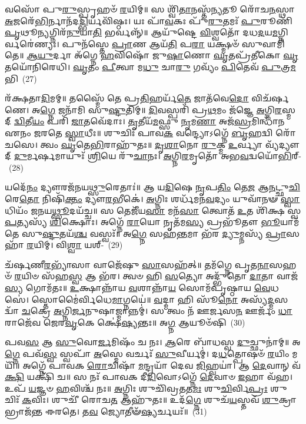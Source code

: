 𑌵𑌸𑍋᳴ 𑌪𑍁\-\ul{𑌰𑍁}\-𑌸𑍍𑌪𑍃𑌹𑍞᳴ \ul{𑌰}\-𑌯𑌿𑌮𑍍॥ 𑌸 𑌶𑍍𑌵𑌿᳴\-\ul{𑌤𑌾}\-𑌨𑌸𑍍𑌤᳴\-\ul{𑌨𑍍𑌯}\-𑌤𑍂 𑌰𑍋᳴𑌚\-\ul{𑌨}\-𑌸𑍍𑌥𑌾 \ul{𑌅}\-𑌜𑌰𑍇᳴\-\ul{𑌭𑌿}\-𑌰𑍍𑌨𑌾𑌨᳴𑌦\-\ul{𑌦𑍍𑌭𑌿}\-𑌰𑍍𑌯𑌵𑌿᳴𑌷𑍍𑌠𑌃। 𑌯𑌃 𑌪𑌾᳴\-\ul{𑌵}\-𑌕𑌃 𑌪𑍁᳴\-\ul{𑌰𑍁}\-𑌤𑌮𑌃᳴ \ul{𑌪𑍁}\-𑌰𑍂𑌣𑌿᳴ \ul{𑌪𑍃}\-𑌥𑍂\-\ul{𑌨𑍍𑌯}\-𑌗𑍍𑌨𑌿𑌰᳴\-\ul{𑌨𑍁}\-𑌯𑌾\-\ul{𑌤𑌿} 𑌭𑌰𑍍𑌵𑌨𑍍𑌨𑍍᳴॥ 𑌆𑌯𑍁᳴𑌷𑍍𑌟𑍇 \ul{𑌵𑌿}\-𑌶𑍍𑌵𑌤𑍋᳴ 𑌦𑌧\-\ul{𑌦}\-𑌯\-\ul{𑌮}\-𑌗𑍍𑌨𑌿𑌰𑍍𑌵𑌰𑍇॑𑌣𑍍𑌯𑌃। 𑌪𑍁𑌨᳴𑌸𑍍𑌤𑍇 \ul{𑌪𑍍𑌰𑌾}\-𑌣 𑌆𑌯᳴\-\ul{𑌤𑌿} 𑌪\-\ul{𑌰𑌾} 𑌯𑌕𑍍𑌷𑍍𑌮𑍞᳴ 𑌸𑍁𑌵𑌾𑌮𑌿 𑌤𑍇॥ \ul{𑌆}\-\-\ul{𑌯𑍁}\-𑌰𑍍𑌦𑌾 𑌅᳴𑌗𑍍𑌨𑍇 \ul{𑌹}\-𑌵𑌿𑌷𑍋᳴ 𑌜𑍁\-\ul{𑌷𑌾}\-𑌣𑍋 \ul{𑌘𑍃}\-𑌤𑌪𑍍𑌰᳴𑌤𑍀𑌕𑍋 \ul{𑌘𑍃}\-𑌤𑌯𑍋᳴𑌨𑌿𑌰𑍇𑌧𑌿। \ul{𑌘𑍃}\-𑌤𑌂 \ul{𑌪𑍀}\-𑌤𑍍𑌵𑌾 𑌮\-\ul{𑌧𑍁} 𑌚𑌾\-\ul{𑌰𑍁} 𑌗𑌵𑍍𑌯𑌂᳴ \ul{𑌪𑌿}\-𑌤𑍇𑌵᳴ \ul{𑌪𑍁}\-𑌤𑍍𑌰\-\ul{𑌮}\-𑌭𑌿~(27)

𑌰᳴𑌕𑍍𑌷𑌤𑌾\-\ul{𑌦𑌿}\-𑌮𑌮𑍍॥ 𑌤𑌸𑍍𑌮𑍈᳴ 𑌤𑍇 𑌪𑍍𑌰\-\ul{𑌤𑌿}\-𑌹𑌰𑍍𑌯᳴\-\ul{𑌤𑍇} 𑌜𑌾𑌤᳴𑌵𑍇\-\ul{𑌦𑍋} 𑌵𑌿𑌚᳴𑌰𑍍\mbox{}𑌷𑌣𑍇। 𑌅\-\ul{𑌗𑍍𑌨𑍇} 𑌜𑌨𑌾᳴𑌮𑌿 𑌸𑍁\-\ul{𑌷𑍍𑌟𑍁}\-𑌤𑌿𑌮𑍍॥ \ul{𑌦𑌿}\-𑌵𑌸𑍍𑌪𑌰𑌿᳴ 𑌪𑍍𑌰\-\ul{𑌥}\-𑌮𑌂 𑌜᳴𑌜𑍍𑌞𑍇 \ul{𑌅}\-𑌗𑍍𑌨𑌿\-\ul{𑌰}\-𑌸𑍍𑌮𑌦𑍍 \ul{𑌦𑍍𑌵𑌿}\-𑌤𑍀\-\ul{𑌯𑌂} 𑌪𑌰𑌿᳴ \ul{𑌜𑌾}\-𑌤𑌵𑍇᳴𑌦𑌾𑌃। \ul{𑌤𑍃}\-𑌤𑍀𑌯᳴\-\ul{𑌮}\-𑌫𑍍𑌸𑍁 \ul{𑌨𑍃}\-𑌮\-\ul{𑌣𑌾} 𑌅𑌜᳴\-\ul{𑌸𑍍𑌰}\-𑌮𑌿𑌨𑍍𑌧𑌾᳴𑌨 𑌏𑌨𑌂 𑌜𑌰𑌤𑍇 \ul{𑌸𑍍𑌵𑌾}\-𑌧𑍀𑌃॥ 𑌶𑍁𑌚𑌿𑌃᳴ 𑌪𑌾𑌵\-\ul{𑌕} 𑌵𑌨𑍍𑌦𑍍𑌯𑍋\-𑌽𑌗𑍍𑌨𑍇᳴ \ul{𑌬𑍃}\-𑌹𑌦𑍍𑌵𑌿 𑌰𑍋᳴𑌚𑌸𑍇। 𑌤𑍍𑌵𑌂 \ul{𑌘𑍃}\-𑌤𑍇\-\ul{𑌭𑌿}\-𑌰𑌾𑌹𑍁᳴𑌤𑌃॥ \ul{𑌦𑍃}\-\-\ul{𑌶𑌾}\-𑌨𑍋 \ul{𑌰𑍁}\-𑌕𑍍𑌮 \ul{𑌉}\-𑌰𑍍𑌵𑍍𑌯𑌾 𑌵𑍍𑌯᳴𑌦𑍍𑌯𑍗𑌦𑍍 \ul{𑌦𑍁}\-𑌰𑍍𑌮𑌰𑍍\mbox{}\-\ul{𑌷}\-𑌮𑌾𑌯𑍁𑌃᳴ \ul{𑌶𑍍𑌰𑌿}\-𑌯𑍇 𑌰𑍁᳴\-\ul{𑌚𑌾}\-𑌨𑌃। \ul{𑌅}\-𑌗𑍍𑌨𑌿\-\ul{𑌰}\-𑌮𑍃𑌤𑍋᳴ 𑌅𑌭\-\ul{𑌵}\-𑌦𑍍𑌵𑌯𑍋᳴\-\ul{𑌭𑌿}\-𑌰𑍍-~(28)

𑌯𑌦𑍇᳴\-\ul{𑌨𑌂} 𑌦𑍍𑌯𑍗𑌰𑌜᳴𑌨𑌯\-\ul{𑌥𑍍𑌸𑍁}\-𑌰𑍇𑌤𑌾𑌃॑॥ 𑌆 𑌯\-\ul{𑌦𑌿}\-𑌷𑍇 \ul{𑌨𑍃}\-𑌪\-\ul{𑌤𑌿𑌂} 𑌤𑍇\-\ul{𑌜} 𑌆\-\ul{𑌨}\-𑌟𑍍𑌛𑍁\-\ul{𑌚𑌿} 𑌰𑍇\-\ul{𑌤𑍋} 𑌨𑌿𑌷𑌿᳴\-\ul{𑌕𑍍𑌤𑌂} 𑌦𑍍𑌯𑍗\-\ul{𑌰}\-𑌭𑍀𑌕𑍇॑। \ul{𑌅}\-𑌗𑍍𑌨𑌿𑌃 𑌶𑌰𑍍𑌧᳴𑌮𑌨\-\ul{𑌵}\-𑌦𑍍𑌯𑌂 𑌯𑍁𑌵𑌾᳴𑌨𑍟 \ul{𑌸𑍍𑌵𑌾}\-𑌧𑌿𑌯𑌂᳴ 𑌜𑌨𑌯\-\ul{𑌥𑍍𑌸𑍂}\-𑌦𑌯᳴𑌚𑍍𑌚॥ 𑌸 𑌤𑍇𑌜𑍀᳴𑌯\-\ul{𑌸𑌾} 𑌮𑌨᳴\-\ul{𑌸𑌾} 𑌤𑍍𑌵𑍋𑌤᳴ \ul{𑌉}\-𑌤 𑌶𑌿᳴𑌕𑍍𑌷 𑌸𑍍𑌵\-\ul{𑌪}\-𑌤𑍍𑌯𑌸𑍍𑌯᳴ \ul{𑌶𑌿}\-𑌕𑍍𑌷𑍋𑌃। 𑌅𑌗𑍍𑌨𑍇᳴ \ul{𑌰𑌾}\-𑌯𑍋 𑌨𑍃𑌤᳴𑌮\-\ul{𑌸𑍍𑌯} 𑌪𑍍𑌰𑌭𑍂᳴𑌤𑍗 \ul{𑌭𑍂}\-𑌯𑌾𑌮᳴ 𑌤𑍇 𑌸𑍁\-\ul{𑌷𑍍𑌟𑍁}\-𑌤𑌯᳴\-\ul{𑌶𑍍𑌚} 𑌵𑌸𑍍𑌵𑌃᳴॥ 𑌅\-\ul{𑌗𑍍𑌨𑍇} 𑌸𑌹᳴\-\ul{𑌨𑍍𑌤}\-𑌮𑌾 𑌭᳴𑌰 \ul{𑌦𑍍𑌯𑍁}\-𑌮𑍍𑌨𑌸𑍍𑌯᳴ \ul{𑌪𑍍𑌰𑌾}\-𑌸𑌹𑌾᳴ \ul{𑌰}\-𑌯𑌿𑌮𑍍। 𑌵𑌿\-\ul{𑌶𑍍𑌵𑌾} 𑌯𑌶𑍍-~(29)

𑌚᳴𑌰𑍍\mbox{}\-\ul{𑌷}\-𑌣𑍀\-\ul{𑌰}\-𑌭𑍍𑌯𑌾᳴𑌸𑌾 𑌵𑌾𑌜𑍇᳴𑌷𑍁 \ul{𑌸𑌾}\-𑌸𑌹᳴𑌤𑍍॥ 𑌤𑌮᳴𑌗𑍍𑌨𑍇 𑌪𑍃𑌤\-\ul{𑌨𑌾}\-𑌸𑌹𑍞᳴ \ul{𑌰}\-𑌯𑌿𑍞 𑌸᳴𑌹\-\ul{𑌸𑍍𑌵} 𑌆 𑌭᳴𑌰। 𑌤𑍍𑌵𑍞 𑌹𑌿 \ul{𑌸}\-𑌤𑍍𑌯𑍋 𑌅𑌦𑍍𑌭𑍁᳴𑌤𑍋 \ul{𑌦𑌾}\-𑌤𑌾 𑌵𑌾𑌜᳴\-\ul{𑌸𑍍𑌯} 𑌗𑍋𑌮᳴𑌤𑌃॥ \ul{𑌉}\-𑌕𑍍𑌷𑌾𑌨𑍍𑌨𑌾᳴𑌯 \ul{𑌵}\-𑌶𑌾𑌨𑍍𑌨𑌾᳴\-\ul{𑌯} 𑌸𑍋𑌮᳴𑌪𑍃𑌷𑍍𑌠𑌾𑌯 \ul{𑌵𑍇}\-𑌧𑌸𑍇॑। 𑌸𑍍𑌤𑍋𑌮𑍈॑𑌰𑍍𑌵𑌿𑌧𑍇\-\ul{𑌮𑌾}\-𑌗𑍍𑌨𑌯𑍇॑॥ \ul{𑌵}\-𑌦𑍍𑌮𑌾 𑌹𑌿 𑌸𑍂᳴\-\ul{𑌨𑍋} 𑌅𑌸𑍍𑌯᳴\-\ul{𑌦𑍍𑌮}\-𑌸𑌦𑍍𑌵𑌾᳴ \ul{𑌚}\-𑌕𑍍𑌰𑍇 \ul{𑌅}\-𑌗𑍍𑌨𑌿\-\ul{𑌰𑍍𑌜}\-𑌨𑍁𑌷𑌾𑌜𑍍𑌮𑌾𑌨𑍍𑌨𑌮𑍍॑। 𑌸 𑌤𑍍𑌵𑌂 𑌨᳴ 𑌊𑌰𑍍𑌜𑌸\-\ul{𑌨} 𑌊𑌰𑍍𑌜𑌂᳴ \ul{𑌧𑌾} 𑌰𑌾𑌜𑍇᳴𑌵 𑌜𑍇𑌰\-\ul{𑌵𑍃}\-𑌕𑍇 𑌕𑍍𑌷𑍇॑\-\ul{𑌷𑍍𑌯}\-𑌨𑍍𑌤𑌃॥ 𑌅\-\ul{𑌗𑍍𑌨} 𑌆𑌯𑍂𑍞᳴𑌷𑌿~(30)

𑌪𑌵\-\ul{𑌸} 𑌆 \ul{𑌸𑍁}\-𑌵𑍋\-\ul{𑌰𑍍𑌜}\-𑌮𑌿𑌷𑌂᳴ 𑌚 𑌨𑌃। \ul{𑌆}\-𑌰𑍇 𑌬𑌾᳴𑌧𑌸𑍍𑌵 \ul{𑌦𑍁}\-𑌚𑍍𑌛𑍁𑌨𑌾॑𑌮𑍍॥ 𑌅\-\ul{𑌗𑍍𑌨𑍇} 𑌪𑌵᳴\-\ul{𑌸𑍍𑌵} 𑌸𑍍𑌵𑌪𑌾᳴ \ul{𑌅}\-𑌸𑍍𑌮𑍇 𑌵𑌰𑍍𑌚𑌃᳴ \ul{𑌸𑍁}\-𑌵𑍀𑌰𑍍𑌯𑌮𑍍॑। 𑌦\-\ul{𑌧}\-𑌤𑍍𑌪𑍋𑌷𑍞᳴ \ul{𑌰}\-𑌯𑌿𑌂 𑌮𑌯𑌿᳴॥ 𑌅𑌗𑍍𑌨𑍇᳴ 𑌪𑌾𑌵𑌕 \ul{𑌰𑍋}\-𑌚𑌿𑌷𑌾᳴ \ul{𑌮}\-𑌨𑍍𑌦𑍍𑌰𑌯𑌾᳴ 𑌦𑍇𑌵 \ul{𑌜𑌿}\-𑌹𑍍𑌵𑌯𑌾॑। 𑌆 \ul{𑌦𑍇}\-𑌵𑌾𑌨𑍍 𑌵᳴\-\ul{𑌕𑍍𑌷𑌿} 𑌯𑌕𑍍𑌷𑌿᳴ 𑌚॥ 𑌸 𑌨𑌃᳴ 𑌪𑌾𑌵𑌕 𑌦𑍀\-\ul{𑌦𑌿}\-𑌵𑍋\-𑌽𑌗𑍍𑌨𑍇᳴ \ul{𑌦𑍇}\-𑌵𑌾𑍞 \ul{𑌇}\-𑌹𑌾 𑌵᳴𑌹। 𑌉𑌪᳴ \ul{𑌯}\-𑌜𑍍𑌞𑍞 \ul{𑌹}\-𑌵𑌿𑌶𑍍𑌚᳴ 𑌨𑌃॥ \ul{𑌅}\-𑌗𑍍𑌨𑌿𑌃 𑌶𑍁𑌚𑌿᳴𑌵𑍍𑌰𑌤𑌤\-\ul{𑌮𑌃} 𑌶𑍁\-\ul{𑌚𑌿}\-𑌰𑍍𑌵𑌿\-\ul{𑌪𑍍𑌰𑌃} 𑌶𑍁𑌚𑌿𑌃᳴ \ul{𑌕}\-𑌵𑌿𑌃। 𑌶𑍁𑌚𑍀᳴ 𑌰𑍋𑌚\-\ul{𑌤} 𑌆𑌹𑍁᳴𑌤𑌃॥ 𑌉𑌦᳴\-\ul{𑌗𑍍𑌨𑍇} 𑌶𑍁𑌚᳴\-\ul{𑌯}\-𑌸𑍍𑌤𑌵᳴ \ul{𑌶𑍁}\-𑌕𑍍𑌰𑌾 𑌭𑍍𑌰𑌾𑌜᳴𑌨𑍍𑌤 𑌈𑌰𑌤𑍇। 𑌤\-\ul{𑌵} 𑌜𑍍𑌯𑍋𑌤𑍀𑍟᳴\-\ul{𑌷𑍍𑌯}\-𑌰𑍍𑌚𑌯𑌃᳴॥~(31)

